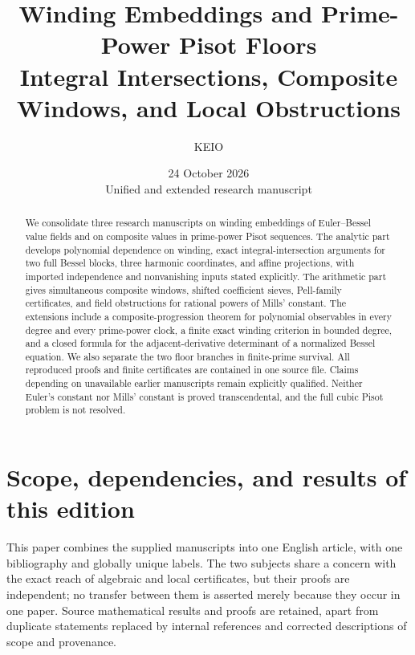 \documentclass[11pt,a4paper]{article}
\title{Winding Embeddings and Prime-Power Pisot Floors\\[4pt]
\large Integral Intersections, Composite Windows, and Local Obstructions}
\author{KEIO}
\date{24 October 2026\\\small Unified and extended research manuscript}
\theoremstyle{definition}\newtheorem{definition}[theorem]{Definition}
\theoremstyle{remark}\newtheorem{remark}[theorem]{Remark}
\begin{document}
\maketitle
\begin{abstract}
We consolidate three research manuscripts on winding embeddings of
Euler--Bessel value fields and on composite values in prime-power Pisot
sequences. The analytic part develops polynomial dependence on winding,
exact integral-intersection arguments for two full Bessel blocks, three
harmonic coordinates, and affine projections, with imported independence
and nonvanishing inputs stated explicitly. The arithmetic part gives
simultaneous composite windows, shifted coefficient sieves, Pell-family
certificates, and field obstructions for rational powers of Mills' constant.
The extensions include a composite-progression theorem for polynomial
observables in every degree and every prime-power clock, a finite exact
winding criterion in bounded degree, and a closed formula for the
adjacent-derivative determinant of a normalized Bessel equation.
We also separate the two floor branches in finite-prime survival.
All reproduced proofs and finite certificates are contained in one source
file. Claims depending on unavailable earlier manuscripts remain explicitly
qualified. Neither Euler's constant nor Mills' constant is proved
transcendental, and the full cubic Pisot problem is not resolved.
\end{abstract}
\tableofcontents
\clearpage
\section{Scope, dependencies, and results of this edition}
\label{unified:scope}
This paper combines the supplied manuscripts \cite{WL,SourceExt,SourcePisot}
into one English article, with one bibliography and globally unique labels.
The two subjects share a concern with the exact reach of algebraic and local
certificates, but their proofs are independent; no transfer between them is
asserted merely because they occur in one paper. Source mathematical results
and proofs are retained, apart from duplicate statements replaced by internal
references and corrected descriptions of scope and provenance.
\end{document}
